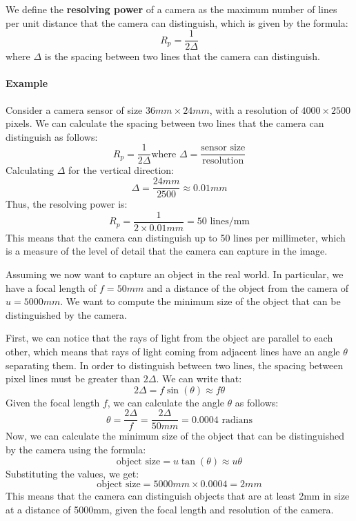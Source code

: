 We define the \textbf{resolving power} of a camera as the maximum number of lines per unit distance that the camera can distinguish, which is given by the formula:
\begin{equation}
    R_p = \frac{1}{2\Delta}
\end{equation}
where $\Delta$ is the spacing between two lines that the camera can distinguish.

\paragraph{Example}
Consider a camera sensor of size $36mm \times 24mm$, with a resolution of $4000 \times 2500$ pixels.
We can calculate the spacing between two lines that the camera can distinguish as follows:
\begin{equation*}
    R_p = \frac{1}{2\Delta} \text{where } \Delta = \frac{\text{sensor size}}{\text{resolution}}
\end{equation*}
Calculating $\Delta$ for the vertical direction:
\begin{equation*}
    \Delta = \frac{24mm}{2500} \approx 0.01mm
\end{equation*}
Thus, the resolving power is:
\begin{equation*}
    R_p = \frac{1}{2 \times 0.01mm} = 50 \text{ lines/mm}
\end{equation*}
This means that the camera can distinguish up to 50 lines per millimeter, which is a measure of the level of detail that the camera can capture in the image.

Assuming we now want to capture an object in the real world. In particular, we have a focal length of $f = 50mm$ and a distance of the object from the camera of $u = 5000mm$. 
We want to compute the minimum size of the object that can be distinguished by the camera.

First, we can notice that the rays of light from the object are parallel to each other, which means that rays of light coming from adjacent lines have an angle $\theta$
separating them.
In order to distinguish between two lines, the spacing between pixel lines must be greater than $2 \Delta$. We can write that:
\begin{equation*}
    2 \Delta = f \sin(\theta) \approx f \theta
\end{equation*}
Given the focal length $f$, we can calculate the angle $\theta$ as follows:
\begin{equation*}
    \theta = \frac{2 \Delta}{f} = \frac{2 \Delta}{50mm} = 0.0004 \text{ radians}
\end{equation*}
Now, we can calculate the minimum size of the object that can be distinguished by the camera using the formula:
\begin{equation*}
    \text{object size} = u \tan(\theta) \approx u \theta
\end{equation*}
Substituting the values, we get:
\begin{equation*}
    \text{object size} = 5000mm \times 0.0004 = 2mm
\end{equation*}
This means that the camera can distinguish objects that are at least 2mm in size at a distance of 5000mm, given the focal length and resolution of the camera.

